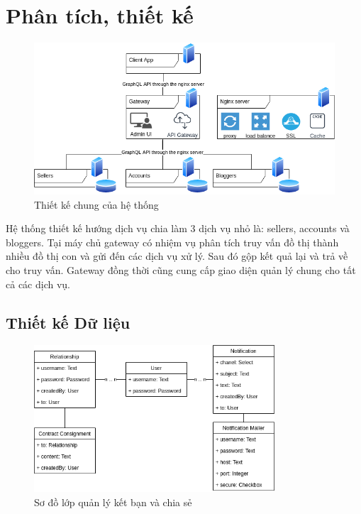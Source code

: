 \documentclass[11pt]{report}
\begin{document}
	\section{Phân tích, thiết kế}\label{section:readme}
	\begin{figure}[h!]\fontsize{13px}{13px}\selectfont
		\begin{center}	
			\includegraphics[width=\textwidth]{srs}
			\caption{Thiết kế chung của hệ thống}
		\end{center}
	\end{figure}
	Hệ thống thiết kế hướng dịch vụ chia làm 3 dịch vụ nhỏ là: sellers, accounts và bloggers. Tại máy chủ gateway có nhiệm vụ phân tích truy vấn đồ thị thành nhiều đồ thị con và gửi đến các dịch vụ xử lý. Sau đó gộp kết quả lại và trả về cho truy vấn. Gateway đồng thời cũng cung cấp giao diện quản lý chung cho tất cả các dịch vụ.
	
	
	
	
	
		\clearpage
	\subsection{Thiết kế Dữ liệu}




\FloatBarrier
\begin{figure}[!htbp]\fontsize{13px}{13px}\selectfont
	\centering
	\includegraphics[width=0.8\textwidth]{class-accounts}
	\caption{Sơ đồ lớp quản lý kết bạn và chia sẻ}
\end{figure}
\end{document}

